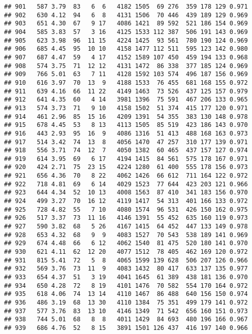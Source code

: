 \documentclass[]{article}
\begin{document}
\begin{verbatim}
## 901   587 3.79  83   6  6   4182 1505  69 276  359 178 129 0.971
## 902   630 4.12  94   6  8   4131 1506  70 446  439 189 129 0.969
## 903   651 4.30  67   9 17   4086 1421  89 592  521 186 154 0.969
## 904   585 3.83  57   3 16   4125 1533 112 387  506 191 143 0.969
## 905   623 3.98  96  11 15   4224 1425  93 561  780 190 124 0.969
## 906   685 4.45  95  10 10   4158 1477 112 511  595 123 142 0.980
## 907   687 4.47  59   4 17   4152 1589 107 450  459 194 133 0.968
## 908   574 3.75  71  12 12   4131 1472  86 338  377 185 124 0.969
## 909   766 5.01  63   7 11   4128 1592 103 574  496 187 156 0.969
## 910   616 3.97  70  13  9   4188 1533  76 455  681 168 155 0.972
## 911   639 4.16  66  11 22   4149 1463  73 526  437 125 157 0.979
## 912   641 4.35  60   4 14   3981 1396  75 591  467 206 133 0.965
## 913   574 3.73  71   9 10   4158 1502  51 374  415 177 120 0.971
## 914   461 2.96  85  15 16   4209 1391  54 355  383 130 148 0.978
## 915   678 4.45  53   8 13   4113 1505  85 519  423 186 143 0.970
## 916   443 2.93  95  16  9   4086 1316  51 413  488 168 163 0.973
## 917   514 3.42  74  13  8   4056 1470  47 257  310 177 139 0.971
## 918   556 3.71  74  12  7   4050 1382  60 465  437 157 127 0.974
## 919   614 3.95  69   6 17   4194 1415  84 561  575 178 167 0.971
## 920   424 2.71  75  23 15   4224 1280  61 400  555 178 156 0.973
## 921   656 4.36  70   8 22   4062 1426  66 612  711 164 122 0.972
## 922   718 4.81  69   6 14   4029 1523  77 644  423 203 121 0.966
## 923   644 4.34  52  10 13   4008 1563  87 410  341 183 156 0.970
## 924   499 3.27  70  16 12   4119 1417  54 313  401 166 133 0.972
## 925   728 4.82  55   7 10   4080 1574  96 531  426 150 162 0.975
## 926   517 3.37  73  11 16   4146 1391  55 452  635 160 119 0.973
## 927   590 3.82  68   5 26   4167 1415  64 452  447 133 149 0.978
## 928   653 4.32  68   9  9   4083 1527  70 543  538 189 141 0.969
## 929   674 4.48  66   6 12   4062 1540  81 475  520 180 141 0.970
## 930   621 4.11  62  12 20   4077 1512  78 405  462 169 120 0.972
## 931   815 5.41  72   5  8   4065 1599 139 628  506 207 126 0.966
## 932   569 3.76  73  11  9   4083 1432  80 417  633 137 135 0.977
## 933   654 4.37  51   3 19   4041 1645  61 389  438 181 136 0.970
## 934   650 4.28  72   8 19   4101 1476  70 582  554 170 164 0.972
## 935   618 4.06  74  13 14   4110 1467  86 488  640 156 150 0.974
## 936   486 3.19  68  13 30   4110 1384  75 351  499 179 141 0.972
## 937   577 3.76  83  13 10   4146 1349  71 542  656 160 151 0.973
## 938   744 5.01  68   8  8   4011 1429  84 693  480 196 166 0.967
## 939   686 4.76  52   8 15   3891 1501 126 437  416 197 140 0.966

\end{verbatim}
\end{document}
